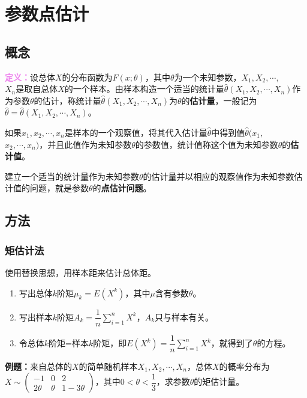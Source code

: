 \section{参数点估计}

\subsection{概念}

\textcolor{violet}{\textbf{定义：}}设总体$X$的分布函数为$F(x;\theta)$，其中$\theta$为一个未知参数，$X_1,X_2,\cdots,$\\$X_n$是取自总体$X$的一个样本。由样本构造一个适当的统计量$\hat{\theta}(X_1,X_2,\cdots,X_n)$作为参数$\theta$的估计，称统计量$\hat{\theta}(X_1,X_2,\cdots,X_n)$为$\theta$的\textbf{估计量}，一般记为$\hat{\theta}=\hat{\theta}(X_1,X_2,\cdots,X_n)$。

如果$x_1,x_2,\cdots,x_n$是样本的一个观察值，将其代入估计量$\hat{\theta}$中得到值$\hat{\theta}(x_1,$\\$x_2,\cdots,x_n)$，并且此值作为未知参数$\theta$的参数值，统计值称这个值为未知参数$\theta$的\textbf{估计值}。

建立一个适当的统计量作为未知参数$\theta$的估计量并以相应的观察值作为未知参数估计值的问题，就是参数$\theta$的\textbf{点估计问题}。

\subsection{方法}

\subsubsection{矩估计法}

使用替换思想，用样本距来估计总体距。

\begin{enumerate}
    \item 写出总体$k$阶矩$\mu_k=E(X^k)$，其中$\mu$含有参数$\theta$。
    \item 写出样本$k$阶矩$A_k=\dfrac{1}{n}\sum\limits_{i=1}^nX^k$，$A_k$只与样本有关。
    \item 令总体$k$阶矩=样本$k$阶矩，即$E(X^k)=\dfrac{1}{n}\sum\limits_{i=1}^nX^k$，就得到了$\theta$的方程。
\end{enumerate}

\textbf{例题：}来自总体的$X$的简单随机样本$X_1,X_2,\cdots,X_n$，总体$X$的概率分布为$X\sim\left(\begin{array}{ccc}
    -1 & 0 & 2 \\
    2\theta & \theta & 1-3\theta
\end{array}\right)$，其中$0<\theta<\dfrac{1}{3}$，求参数$\theta$的矩估计量。

